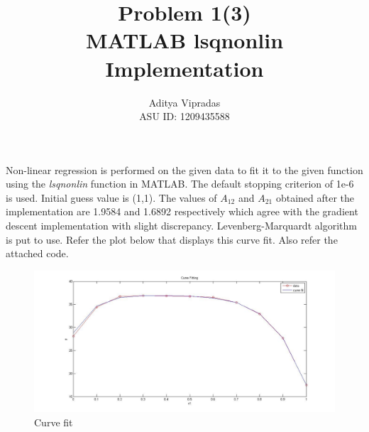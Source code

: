 \documentclass[12pt]{article}
\title{\textbf{Problem 1(3)\\MATLAB lsqnonlin Implementation}}
\author{Aditya Vipradas\\ASU ID: 1209435588}
\begin{document}
\maketitle
Non-linear regression is performed on the given data to fit it to the given function using the \emph{lsqnonlin} function in MATLAB. The default stopping criterion of 1e-6 is used. Initial guess value is (1,1). The values of $A_{12}$ and $A_{21}$ obtained after the implementation are 1.9584 and 1.6892 respectively which agree with the gradient descent implementation with slight discrepancy. Levenberg-Marquardt algorithm is put to use. Refer the plot below that displays this curve fit. Also refer the attached code.
\begin{figure}[H]
\begin{center}
\includegraphics[scale=0.4]{curve.jpg}
\caption{Curve fit}  
\end{center}
\end{figure}
\end{document}
